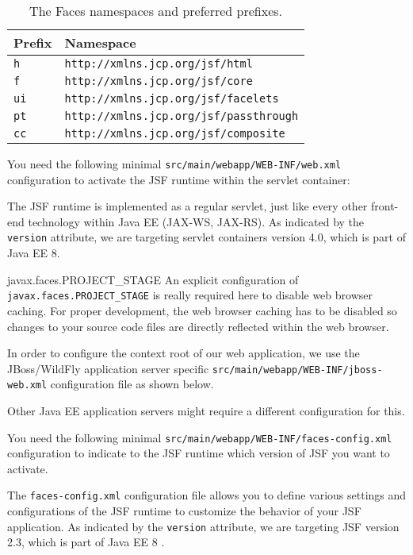 \begin{table}[h!]
\begin{center}
	\begin{tabular}{ |l|l|}
		\hline
		\textbf{Prefix} & \textbf{Namespace} \\
		\hline\hline
		\texttt{h} & \texttt{http://xmlns.jcp.org/jsf/html}  \\
		\hline
		\texttt{f} & \texttt{http://xmlns.jcp.org/jsf/core}  \\
		\hline
		\texttt{ui} & \texttt{http://xmlns.jcp.org/jsf/facelets}  \\
		\hline
		\texttt{pt} & \texttt{http://xmlns.jcp.org/jsf/passthrough}  \\
		\hline
		\texttt{cc} & \texttt{http://xmlns.jcp.org/jsf/composite}  \\
		\hline
	\end{tabular}
\end{center}
\caption{The Faces namespaces and preferred prefixes.}
\label{table:namespaces}
\end{table}

You need the following minimal \texttt{src/main/webapp/WEB-INF/web.xml} configuration to activate the JSF runtime within the servlet container:

The JSF runtime is implemented as a regular servlet, just like every other front-end technology within Java EE (JAX-WS, JAX-RS).
As indicated by the \texttt{version} attribute, we are targeting servlet containers version 4.0, which is part of Java EE 8.
\begin{TIP}{javax.faces.PROJECT\_STAGE}
	An explicit configuration of \texttt{javax.faces.PROJECT\_STAGE} is really required here to disable web browser caching.
	For proper development, the web browser caching has to be disabled so changes to your source code files are directly reflected within the web browser.
\end{TIP}

In order to configure the context root of our web application, we use the JBoss/WildFly application server specific 
\texttt{src/main/webapp/WEB-INF/jboss-web.xml} configuration file as shown below.

Other Java EE application servers might require a different configuration for this.

You need the following minimal \texttt{src/main/webapp/WEB-INF/faces-config.xml} configuration to indicate to the JSF runtime which version of JSF you want to activate.

The \texttt{faces-config.xml} configuration file allows you to define various settings and configurations of the JSF runtime to customize the behavior of your JSF application.
As indicated by the \texttt{version} attribute, we are targeting JSF version 2.3, which is part of Java EE 8  \cite{JavaEE8}.

